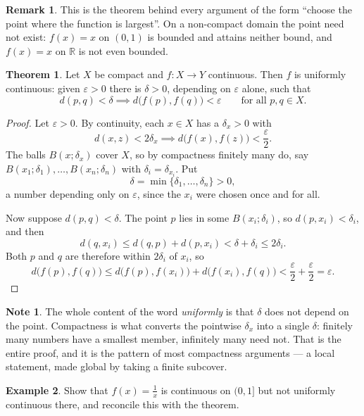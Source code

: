 \documentclass[11pt,a4paper]{article}
\theoremstyle{definition}
\newtheorem{thm}{Theorem}[section]
\newtheorem{exa}[thm]{Example}
\newtheorem*{note}{Note}
\newtheorem*{remark}{Remark}
\begin{document}
\begin{remark}
This is the theorem behind every argument of the form ``choose the point where
the function is largest''. On a non-compact domain the point need not exist:
$f(x)=x$ on $(0,1)$ is bounded and attains neither bound, and $f(x)=x$ on
$\mathbb{R}$ is not even bounded.
\end{remark}

\begin{thm}
Let $X$ be compact and $f:X\rightarrow Y$ continuous. Then $f$ is uniformly
continuous: given $\varepsilon>0$ there is $\delta>0$, depending on
$\varepsilon$ alone, such that
$$d(p,q)<\delta \implies d\big(f(p),f(q)\big)<\varepsilon
\qquad\text{for all } p,q\in X .$$
\end{thm}

\begin{proof}
Let $\varepsilon>0$. By continuity, each $x\in X$ has a $\delta_x>0$ with
$$d(x,z)<2\delta_x \implies d\big(f(x),f(z)\big)<\frac{\varepsilon}{2}.$$
The balls $B(x;\delta_x)$ cover $X$, so by compactness finitely many do, say
$B(x_1;\delta_1),\dots,B(x_n;\delta_n)$ with $\delta_i=\delta_{x_i}$. Put
$$\delta = \min\{\delta_1,\dots,\delta_n\}>0 ,$$
a number depending only on $\varepsilon$, since the $x_i$ were chosen once and
for all.

Now suppose $d(p,q)<\delta$. The point $p$ lies in some $B(x_i;\delta_i)$, so
$d(p,x_i)<\delta_i$, and then
$$d(q,x_i)\leq d(q,p)+d(p,x_i) < \delta + \delta_i \leq 2\delta_i .$$
Both $p$ and $q$ are therefore within $2\delta_i$ of $x_i$, so
$$d\big(f(p),f(q)\big)\leq d\big(f(p),f(x_i)\big)+d\big(f(x_i),f(q)\big)
< \frac{\varepsilon}{2}+\frac{\varepsilon}{2} = \varepsilon .$$
\end{proof}

\begin{note}
The whole content of the word \emph{uniformly} is that $\delta$ does not depend
on the point. Compactness is what converts the pointwise $\delta_x$ into a single
$\delta$: finitely many numbers have a smallest member, infinitely many need
not. That is the entire proof, and it is the pattern of most compactness
arguments --- a local statement, made global by taking a finite subcover.
\end{note}

\begin{exa}
Show that $\displaystyle{f(x)=\frac1x}$ is continuous on $(0,1]$ but not
uniformly continuous there, and reconcile this with the theorem.
\end{exa}
\end{document}
